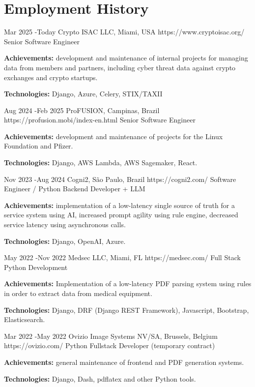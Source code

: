 \documentclass[10pt]{article} %
\begin{document}

\section{Employment History}

\job
{Mar 2025 -}{Today}
{Crypto ISAC LLC, Miami, USA}
{https://www.cryptoisac.org/}
{Senior Software Engineer}
{\rule{0mm}{2mm}\textbf{Achievements:} development and maintenance of internal projects for managing data from members and partners, including cyber threat data against crypto exchanges and crypto startups.\\
\rule{0mm}{3mm}\textbf{Technologies:} Django, Azure, Celery, STIX/TAXII}

\job
{Aug 2024 -}{Feb 2025}
{ProFUSION, Campinas, Brazil}
{https://profusion.mobi/index-en.html}
{Senior Software Engineer}
{\rule{0mm}{2mm}\textbf{Achievements:} development and maintenance of projects for the Linux Foundation and Pfizer.\\
\rule{0mm}{3mm}\textbf{Technologies:} Django, AWS Lambda, AWS Sagemaker, React.}


\job
{Nov 2023 -}{Aug 2024}
{Cogni2, São Paulo, Brazil}
{https://cogni2.com/}
{Software Engineer / Python Backend Developer + LLM}
{\rule{0mm}{2mm}\textbf{Achievements:} implementation of a low-latency single source of truth for a service system using AI, increased prompt agility using rule engine, decreased service latency using asynchronous calls.\\
\rule{0mm}{3mm}\textbf{Technologies:} Django, OpenAI, Azure.}


\job
{May 2022 -}{Nov 2022}
{Medsec LLC, Miami, FL}
{https://medsec.com/}
{Full Stack Python Development}
{\rule{0mm}{2mm}\textbf{Achievements:} Implementation of a low-latency PDF parsing system using rules in order to extract data from medical equipment.\\
\rule{0mm}{3mm}\textbf{Technologies:} Django, DRF (Django REST Framework), Javascript, Bootstrap, Elasticsearch.}

\job
{Mar 2022 -}{May 2022}
{Ovizio Image Systems NV/SA, Brussels, Belgium}
{https://ovizio.com/}
{Python Fullstack Developer (temporary contract)}
{\rule{0mm}{2mm}\textbf{Achievements:} general maintenance of frontend and PDF generation systems.\\
\rule{0mm}{3mm}\textbf{Technologies:} Django, Dash, pdflatex and other Python tools.}
\end{document}
